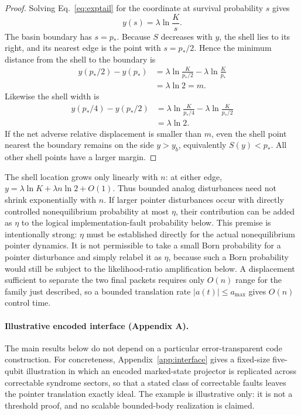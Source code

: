 \documentclass[pdflatex,sn-mathphys-num]{sn-jnl}
\theoremstyle{thmstyleone}
\begin{document}
\begin{proof}
Solving Eq.~\eqref{eq:exptail} for the coordinate at survival probability $s$ gives
\begin{equation}
y(s)=\lambda\ln\frac{K}{s}.
\end{equation}
The basin boundary has $s=p_*$. Because $S$ decreases with $y$, the shell lies to its right, and its nearest edge is the point with $s=p_*/2$. Hence the minimum distance from the shell to the boundary is
\begin{align}
y(p_*/2)-y(p_*)
&=\lambda\ln\frac{K}{p_*/2}-\lambda\ln\frac{K}{p_*}\\
&=\lambda\ln2=m.
\end{align}
Likewise the shell width is
\begin{align}
y(p_*/4)-y(p_*/2)
&=\lambda\ln\frac{K}{p_*/4}-\lambda\ln\frac{K}{p_*/2}\\
&=\lambda\ln2.
\end{align}
If the net adverse relative displacement is smaller than $m$, even the shell point nearest the boundary remains on the side $y>y_b$, equivalently $S(y)<p_*$. All other shell points have a larger margin.
\end{proof}

The shell location grows only linearly with $n$: at either edge, $y=\lambda\ln K+\lambda n\ln2+O(1)$. Thus bounded analog disturbances need not shrink exponentially with $n$. If larger pointer disturbances occur with directly controlled nonequilibrium probability at most $\eta$, their contribution can be added as $\eta$ to the logical implementation-fault probability below. This premise is intentionally strong: $\eta$ must be established directly for the actual nonequilibrium pointer dynamics. It is not permissible to take a small Born probability for a pointer disturbance and simply relabel it as $\eta$, because such a Born probability would still be subject to the likelihood-ratio amplification below. A displacement sufficient to separate the two final packets requires only $O(n)$ range for the family just described, so a bounded translation rate $|a(t)|\le a_{\max}$ gives $O(n)$ control time.

\paragraph{Illustrative encoded interface (Appendix A).} The main results below do not depend on a particular error-transparent code construction. For concreteness, Appendix~\ref{app:interface} gives a fixed-size five-qubit illustration in which an encoded marked-state projector is replicated across correctable syndrome sectors, so that a stated class of correctable faults leaves the pointer translation exactly ideal. The example is illustrative only: it is not a threshold proof, and no scalable bounded-body realization is claimed.
\end{document}
